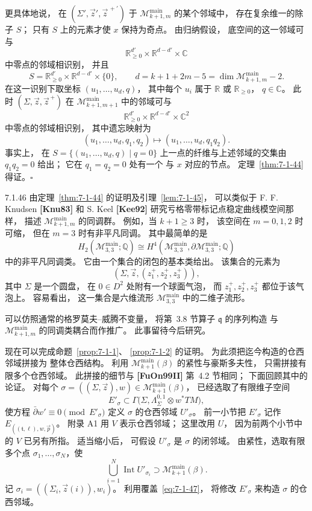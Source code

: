 更具体地说，
在
$(\Sigma',\vec z',\vec z^{\, +\prime})$
于
$\mathcal M^{\mathrm{main}}_{k+1,m}$
的某个邻域中，
存在复余维一的除子 $S$；
只有 $S$ 上的元素才使 $x$ 保持为奇点。
由归纳假设，
底空间的这一邻域可与
\[
\mathbb R_{\ge0}^{d'}\times
\mathbb R^{d-d'}\times\mathbb C
\]
中零点的邻域相识别，
并且
\[
S=\mathbb R_{\ge0}^{d'}\times
\mathbb R^{d-d'}\times\{0\},
\qquad
d=k+1+2m-5
=\dim\mathcal M^{\mathrm{main}}_{k+1,m}-2.
\]
在这一识别下取坐标
$(u_1,\ldots,u_d,q)$，
其中每个 $u_i$ 属于
$\mathbb R$ 或 $\mathbb R_{\ge0}$，
$q\in\mathbb C$。
此时
$(\Sigma,\vec z,\vec z^{\, +})$
在
$\mathcal M^{\mathrm{main}}_{k+1,m+1}$
中的邻域可与
\[
\mathbb R_{\ge0}^{d'}\times
\mathbb R^{d-d'}\times\mathbb C^2
\]
中零点的邻域相识别，
其中遗忘映射为
\[
(u_1,\ldots,u_d,q_1,q_2)
\longmapsto
(u_1,\ldots,u_d,q_1q_2).
\]
事实上，
在
$S=\{(u_1,\ldots,u_d,q)\mid q=0\}$
上一点的纤维与上述邻域的交集由
$q_1q_2=0$ 给出；
它在 $q_1=q_2=0$ 处有一个
与 $x$ 对应的节点。
定理~\ref{thm:7-1-44} 得证。\hfill$\square$

\begin{remark}{7.1.46}\label{rem:7-1-46}
由定理~\ref{thm:7-1-44}
的证明及引理~\ref{lem:7-1-45}，
可以类似于
F. F. Knudsen \textbf{[Knu83]} 和
S. Keel \textbf{[Kee92]}
研究亏格零带标记点稳定曲线模空间那样，
描述
$\mathcal M^{\mathrm{main}}_{k+1,m}$
的同调群。
例如，当 $k+1\ge3$ 时，
该空间在 $m=0,1,2$ 时可缩，
但在 $m=3$ 时有非平凡同调。
其中最简单的是
\[
H_2(\mathcal M^{\mathrm{main}}_{3,3};\mathbb Q)
\cong
H^4(\mathcal M^{\mathrm{main}}_{3,3},
\partial\mathcal M^{\mathrm{main}}_{3,3};\mathbb Q)
\]
中的非平凡同调类。
它由一个集合的闭包的基本类给出。
该集合的元素为
\[
(\Sigma,\vec z,(z_1^+,z_2^+,z_3^+)),
\]
其中 $\Sigma$ 是一个圆盘，
在 $0\in D^2$ 处附有一个球面气泡，
而 $z_1^+,z_2^+,z_3^+$
都位于该气泡上。
容易看出，
这一集合是六维流形
$\mathcal M^{\mathrm{main}}_{3,3}$
中的二维子流形。

可以仿照通常的格罗莫夫--威腾不变量，
将第~3.8 节算子
$\mathfrak q$ 的序列构造
与
$\mathcal M^{\mathrm{main}}_{k+1,m}$
的同调类耦合而作推广。
此事留待今后研究。
\end{remark}

现在可以完成命题~\ref{prop:7-1-1}、
\ref{prop:7-1-2} 的证明。
为此须把迄今构造的仓西邻域拼接为
整体仓西结构。
利用
$\mathcal M^{\mathrm{main}}_{k+1}(\beta)$
的紧性与豪斯多夫性，
只需拼接有限多个仓西邻域。
此拼接的细节与
\textbf{[FuOn99II]} 第~4.2 节相同；
下面回顾其中的论证。
对每个
$\sigma=((\Sigma,\vec z),w)
\in\mathcal M^{\mathrm{main}}_{k+1}(\beta)$，
已经选取了有限维子空间
\[
E'_\sigma\subset
\Gamma\bigl(
\Sigma,\Lambda^{0,1}_\Sigma\otimes w^*TM
\bigr),
\]
使方程
$\bar\partial w'\equiv0\pmod{E'_\sigma}$
定义 $\sigma$ 的仓西邻域
$U'_\sigma$。
前一小节把 $E'_\sigma$
记作
$E_{((\mathfrak t,\ell),w,\vec p)}$。
附录 A1 用 $V$ 表示仓西邻域；
这里改用 $U$，
因为前两个小节中的 $V$ 已另有所指。
适当缩小后，
可假设 $U'_\sigma$ 是 $\sigma$ 的闭邻域。
由紧性，选取有限多个点
$\sigma_1,\ldots,\sigma_N$，使
\begin{equation}
\bigcup_{i=1}^{N}
\operatorname{Int}U'_{\sigma_i}
\supset
\mathcal M^{\mathrm{main}}_{k+1}(\beta).
\tag{7.1.47}\label{eq:7-1-47}
\end{equation}
记
$\sigma_i=((\Sigma_i,\vec z(i)),w_i)$。
利用覆盖~\eqref{eq:7-1-47}，
将修改 $E'_\sigma$
来构造 $\sigma$ 的仓西邻域。

